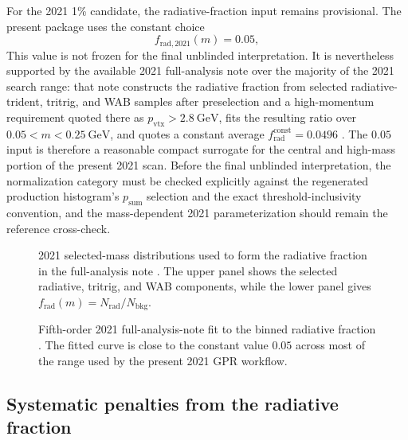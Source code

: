 For the 2021 1\% candidate, the radiative-fraction input remains provisional. The
present package uses the constant choice
\begin{equation}
f_{\mathrm{rad},2021}(m) = 0.05,
\end{equation}
This value is not frozen for the final unblinded interpretation. It is nevertheless
supported by the available 2021 full-analysis note over the
majority of the 2021 search range: that note constructs the radiative fraction from
selected radiative-trident, tritrig, and WAB samples after preselection and a
high-momentum requirement quoted there as $p_{\mathrm{vtx}}>2.8~\mathrm{GeV}$, fits the resulting ratio over
$0.05<m<0.25~\mathrm{GeV}$, and quotes a constant average
$f_{\mathrm{rad}}^{\mathrm{const}}=0.0496$ \cite[Sec.~6.1, Figs.~92--93,
Eqs.~25--26]{HPS2021FullAnalysisNote}. The $0.05$ input is therefore a reasonable
compact surrogate for the central and high-mass portion of the present 2021 scan.
Before the final unblinded interpretation, the normalization category must be checked
explicitly against the regenerated production histogram's
$p_{\mathrm{sum}}$ selection and the exact threshold-inclusivity convention, and the
mass-dependent 2021 parameterization should remain the reference cross-check.

\begin{figure}[H]
\centering
{}
\caption{2021 selected-mass distributions used to form the radiative fraction in the
full-analysis note \cite{HPS2021FullAnalysisNote}. The upper panel shows the selected
radiative, tritrig, and WAB components, while the lower panel gives
$f_{\mathrm{rad}}(m)=N_{\mathrm{rad}}/N_{\mathrm{bkg}}$.}
\label{fig:2021-radfrac-note-components}
\end{figure}

\begin{figure}[H]
\centering
{}
\caption{Fifth-order 2021 full-analysis-note fit to the binned radiative fraction
\cite{HPS2021FullAnalysisNote}. The fitted curve is close to the constant value
$0.05$ across most of the range used by the present 2021 GPR workflow.}
\label{fig:2021-radfrac-note-fit}
\end{figure}

\subsection{Systematic penalties from the radiative fraction}
\label{sec:radfrac-penalty}

